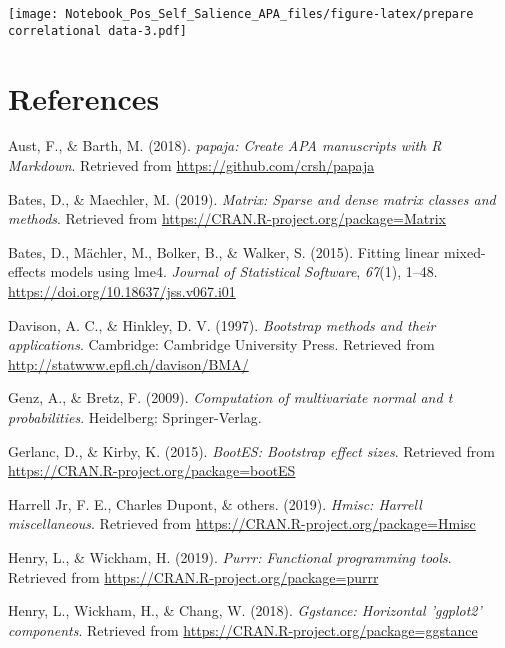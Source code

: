 \documentclass[man]{apa6}
\begin{document}
\texttt{[image: Notebook\_Pos\_Self\_Salience\_APA\_files/figure-latex/prepare correlational data-3.pdf]}

\hypertarget{references}{%
\section{References}\label{references}}

\begingroup
\setlength{\parindent}{-0.5in}
\setlength{\leftskip}{0.5in}

\hypertarget{refs}{}
\leavevmode\hypertarget{ref-R-papaja}{}%
Aust, F., \& Barth, M. (2018). \emph{papaja: Create APA manuscripts with R Markdown}. Retrieved from \url{https://github.com/crsh/papaja}

\leavevmode\hypertarget{ref-R-Matrix}{}%
Bates, D., \& Maechler, M. (2019). \emph{Matrix: Sparse and dense matrix classes and methods}. Retrieved from \url{https://CRAN.R-project.org/package=Matrix}

\leavevmode\hypertarget{ref-R-lme4}{}%
Bates, D., Mächler, M., Bolker, B., \& Walker, S. (2015). Fitting linear mixed-effects models using lme4. \emph{Journal of Statistical Software}, \emph{67}(1), 1--48. \url{https://doi.org/10.18637/jss.v067.i01}

\leavevmode\hypertarget{ref-R-boot}{}%
Davison, A. C., \& Hinkley, D. V. (1997). \emph{Bootstrap methods and their applications}. Cambridge: Cambridge University Press. Retrieved from \url{http://statwww.epfl.ch/davison/BMA/}

\leavevmode\hypertarget{ref-R-mvtnorm}{}%
Genz, A., \& Bretz, F. (2009). \emph{Computation of multivariate normal and t probabilities}. Heidelberg: Springer-Verlag.

\leavevmode\hypertarget{ref-R-bootES}{}%
Gerlanc, D., \& Kirby, K. (2015). \emph{BootES: Bootstrap effect sizes}. Retrieved from \url{https://CRAN.R-project.org/package=bootES}

\leavevmode\hypertarget{ref-R-Hmisc}{}%
Harrell Jr, F. E., Charles Dupont, \& others. (2019). \emph{Hmisc: Harrell miscellaneous}. Retrieved from \url{https://CRAN.R-project.org/package=Hmisc}

\leavevmode\hypertarget{ref-R-purrr}{}%
Henry, L., \& Wickham, H. (2019). \emph{Purrr: Functional programming tools}. Retrieved from \url{https://CRAN.R-project.org/package=purrr}

\leavevmode\hypertarget{ref-R-ggstance}{}%
Henry, L., Wickham, H., \& Chang, W. (2018). \emph{Ggstance: Horizontal 'ggplot2' components}. Retrieved from \url{https://CRAN.R-project.org/package=ggstance}
\end{document}
